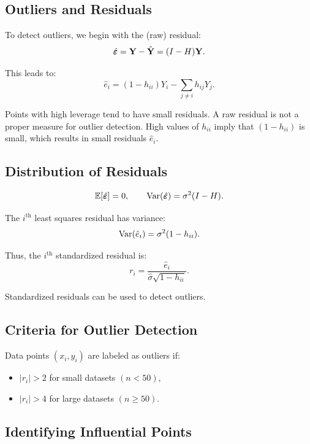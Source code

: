 \subsection{Outliers and Residuals}

To detect outliers, we begin with the (raw) residual:
\[
\hat{\boldsymbol{\varepsilon}} = \mathbf{Y} - \hat{\mathbf{Y}} = (I - H)\mathbf{Y}.
\]

This leads to:
\[
\hat{e}_i = (1 - h_{ii})Y_i - \sum_{j \ne i} h_{ij} Y_j.
\]

\begin{caution}
Points with high leverage tend to have small residuals. A raw residual is not a proper measure for outlier detection. High values of $h_{ii}$ imply that $(1 - h_{ii})$ is small, which results in small residuals $\hat{e}_i$.
\end{caution}

\subsection{Distribution of Residuals}

\[
\mathbb{E}[\hat{\boldsymbol{\varepsilon}}] = 0,
\qquad
\operatorname{Var}(\hat{\boldsymbol{\varepsilon}}) = \sigma^2 (I - H).
\]

The $i^{\text{th}}$ least squares residual has variance:
\[
\operatorname{Var}(\hat{e}_i) = \sigma^2 (1 - h_{ii}).
\]

Thus, the $i^{\text{th}}$ standardized residual is:
\[
r_i = \frac{\hat{e}_i}{\hat{\sigma}\sqrt{1 - h_{ii}}}.
\]

Standardized residuals can be used to detect outliers.

\subsection{Criteria for Outlier Detection}

\begin{keyresult}
Data points $(x_i, y_i)$ are labeled as outliers if:
\begin{itemize}
\item $|r_i| > 2$ for small datasets $(n < 50)$,
\item $|r_i| > 4$ for large datasets $(n \ge 50)$.
\end{itemize}
\end{keyresult}

\subsection{Identifying Influential Points}

